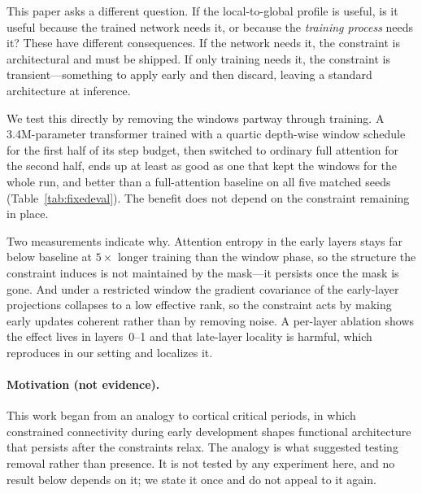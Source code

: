 \documentclass[11pt,a4paper]{article}
\begin{document}
This paper asks a different question. If the local-to-global profile is useful, is it useful because the trained network needs it, or because the \emph{training process} needs it? These have different consequences. If the network needs it, the constraint is architectural and must be shipped. If only training needs it, the constraint is transient---something to apply early and then discard, leaving a standard architecture at inference.

We test this directly by removing the windows partway through training. A 3.4M-parameter transformer trained with a quartic depth-wise window schedule for the first half of its step budget, then switched to ordinary full attention for the second half, ends up at least as good as one that kept the windows for the whole run, and better than a full-attention baseline on all five matched seeds (Table~\ref{tab:fixedeval}). The benefit does not depend on the constraint remaining in place.

Two measurements indicate why. Attention entropy in the early layers stays far below baseline at $5\times$ longer training than the window phase, so the structure the constraint induces is not maintained by the mask---it persists once the mask is gone. And under a restricted window the gradient covariance of the early-layer projections collapses to a low effective rank, so the constraint acts by making early updates coherent rather than by removing noise. A per-layer ablation shows the effect lives in layers~0--1 and that late-layer locality is harmful, which reproduces \citet{rae2020deep} in our setting and localizes it.

\paragraph{Motivation (not evidence).} This work began from an analogy to cortical critical periods, in which constrained connectivity during early development shapes functional architecture that persists after the constraints relax. The analogy is what suggested testing removal rather than presence. It is not tested by any experiment here, and no result below depends on it; we state it once and do not appeal to it again.
\end{document}
